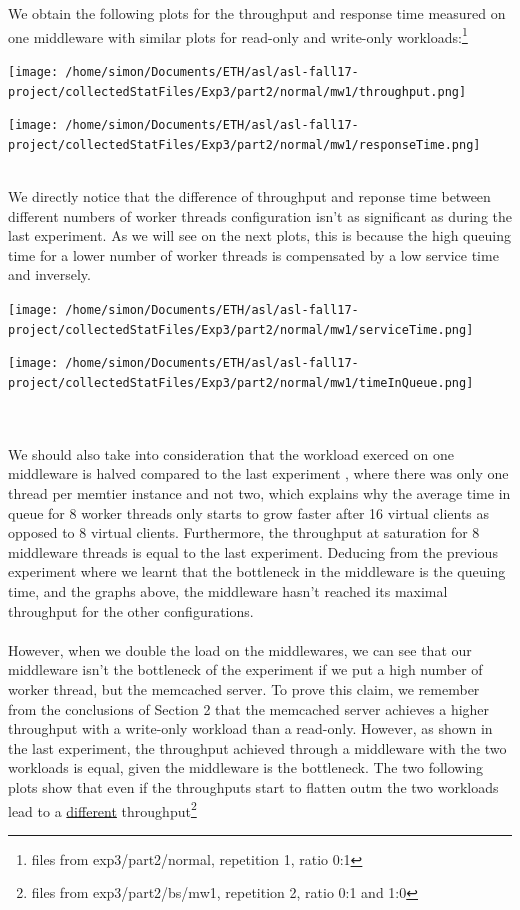 \documentclass[11pt,a4paper]{article}
\begin{document}
We obtain the following plots for the throughput and response time measured on one middleware with similar plots for read-only and write-only workloads:\footnote{files from exp3/part2/normal, repetition 1, ratio 0:1}
\\
\begin{minipage}{0.42\linewidth}
\texttt{[image: /home/simon/Documents/ETH/asl/asl-fall17-project/collectedStatFiles/Exp3/part2/normal/mw1/throughput.png]}
\end{minipage}
\hfill
\begin{minipage}{0.42\linewidth}
\texttt{[image: /home/simon/Documents/ETH/asl/asl-fall17-project/collectedStatFiles/Exp3/part2/normal/mw1/responseTime.png]}
\end{minipage}
\\
We directly notice that the difference of throughput and reponse time between different numbers of worker threads configuration isn't as significant as during the last experiment. As we will see on the next plots, this is because the high queuing time for a lower number of worker threads is compensated by a low service time and inversely. 
\\
\begin{minipage}{0.49\linewidth}
\texttt{[image: /home/simon/Documents/ETH/asl/asl-fall17-project/collectedStatFiles/Exp3/part2/normal/mw1/serviceTime.png]}
\end{minipage}
\hfill
\begin{minipage}{0.49\linewidth}
\texttt{[image: /home/simon/Documents/ETH/asl/asl-fall17-project/collectedStatFiles/Exp3/part2/normal/mw1/timeInQueue.png]}
\end{minipage}
\\\\ 
We should also take into consideration that the workload exerced on one middleware is halved compared to the last experiment , where there was only one thread per memtier instance and not two, which explains why the average time in queue for 8 worker threads only starts to grow faster after 16 virtual clients as opposed to 8 virtual clients. Furthermore, the throughput at saturation for 8 middleware threads is equal to the last experiment. 
Deducing from the previous experiment where we learnt that the bottleneck in the middleware is the queuing time, and the graphs above, the middleware hasn't reached its maximal throughput for the other configurations. 
\\\\
However, when we double the load on the middlewares, we can see that our middleware isn't the bottleneck of the experiment if we put a high number of worker thread, but the memcached server. To prove this claim, we remember from the conclusions of Section 2 that the memcached server achieves a higher throughput with a write-only workload than a read-only. However, as shown in the last experiment, the throughput achieved through a middleware with the two workloads is equal, given the middleware is the bottleneck. The two following plots show that even if the throughputs start to flatten outm the two workloads lead to a \underline{different} throughput\footnote{files from exp3/part2/bs/mw1, repetition 2, ratio 0:1 and 1:0}   
\end{document}
